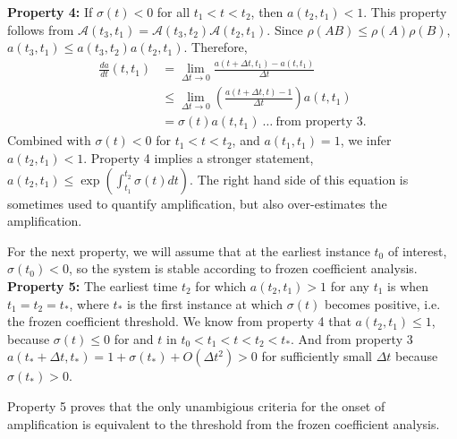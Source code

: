 \documentclass[letterpaper,10pt,prl,twocolumn,aps,reprint,superscriptaddress]{revtex4-1}
\newcommand{\cA}{\boldsymbol{\mathcal{A}}}
\newcommand{\tc}{t_*}
\begin{document}
{\bf Property 4:}
If $\sigma(t)<0$ for all $t_1<t<t_2$, then $a(t_2, t_1) < 1$.
This property follows from $\cA(t_3, t_1) = \cA(t_3, t_2) \cA(t_2, t_1)$. 
Since $\rho(AB) \le \rho(A) \rho(B)$, $a(t_3, t_1) \le a(t_3, t_2) a(t_2, t_1)$.
Therefore,
\begin{align}
 \frac{da}{dt}(t, t_1) &=    \lim_{\Delta t \to 0} \frac{a(t+\Delta t, t_1) - a(t, t_1)}{\Delta t} \nonumber \\
                       &\le \lim_{\Delta t \to 0} \left(\frac{a(t+\Delta t, t) - 1}{\Delta t}\right) a(t, t_1) \nonumber \\
                       &=   \sigma(t) a(t, t_1) ~ \dots ~ \text{from property 3.} \label{eqn:prop4}
\end{align}
Combined with $\sigma(t)<0$ for $t_1<t<t_2$, and $a(t_1, t_1) = 1$, we infer $a(t_2, t_1)<1$. Property 4 implies a stronger statement, $ a(t_2, t_1) \le \exp(\int_{t_1}^{t_2} \sigma(t) dt).$ The right hand side of this equation is sometimes used to quantify amplification\cite{fullana1999stability,zhang2010wavelength}, but also over-estimates the amplification. 

For the next property, we will assume that at the earliest instance $t_0$ of interest, $\sigma(t_0)<0$, so the system is stable according to frozen coefficient analysis.
{\bf Property 5:}
The earliest time $t_2$ for which $a(t_2, t_1)>1$ for any $t_1$ is when $t_1=t_2=\tc$, where $\tc$ is the first instance at which $\sigma(t)$ becomes positive, i.e. the frozen coefficient threshold. 
We know from property 4 that $a(t_2, t_1)\le 1$, because $\sigma(t)\le 0$ for and $t$ in $t_0<t_1<t < t_2 < \tc$. And from property 3 $a(\tc+\Delta t, \tc) = 1 + \sigma(\tc) + O(\Delta t^2) > 0$ for sufficiently small $\Delta t$ because $\sigma(\tc)>0$. 

Property 5 proves that the only unambigious criteria for the onset of amplification is equivalent to the threshold from the frozen coefficient analysis.
\end{document}
